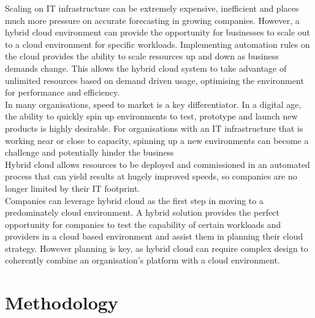 \documentclass[a4paper,12pt]{report}
\begin{document}
\newline
Scaling on IT infrastructure can be extremely expensive, inefficient and places much more pressure on accurate forecasting in growing companies. However, a hybrid cloud environment can provide the opportunity for businesses to scale out to a cloud environment for specific workloads. Implementing automation rules on the cloud provides the ability to scale resources up and down as business demands change. This allows the hybrid cloud system to take advantage of unlimited resources based on demand driven usage, optimising the environment for performance and efficiency.\\
\newline
In many organisations, speed to market is a key differentiator. In a digital age, the ability to quickly spin up environments to test, prototype and launch new products is highly desirable. For organisations with an IT infrastructure that is working near or close to capacity, spinning up a new environments can become a challenge and potentially hinder the business\\
\newline
Hybrid cloud allows resources to be deployed and commissioned in an automated process that can yield results at hugely improved speeds, so companies are no longer limited by their IT footprint.\\
\newline
Companies can leverage hybrid cloud as the first step in moving to a predominately cloud environment. A hybrid solution provides the perfect opportunity for companies to test the capability of certain workloads and providers in a cloud based environment and assist them in planning their cloud strategy. However planning is key, as hybrid cloud can require complex design to coherently combine an organisation’s platform with a cloud environment.

\chapter{Methodology}
\end{document}

